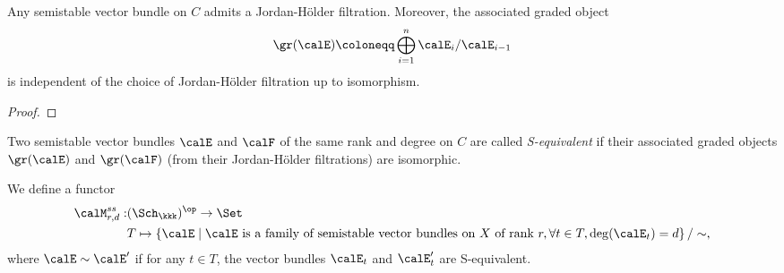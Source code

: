     \begin{proposition}\label{prop:existence_and_uniqueness_of_Jordan-Holder_filtration}
        Any semistable vector bundle on \(C\) admits a Jordan-H\"older filtration.
        Moreover, the associated graded object 
        \[ \gr(\calE) \coloneqq \bigoplus_{i=1}^n \calE_i/\calE_{i-1} \]
        is independent of the choice of Jordan-H\"older filtration up to isomorphism.
    \end{proposition}
    \begin{proof}
    \end{proof}

    \begin{definition}[S-equivalence]\label{def:S-equivalence}
        Two semistable vector bundles \(\calE\) and \(\calF\) of the same rank and degree on \(C\) are called \emph{S-equivalent} 
        if their associated graded objects \(\gr(\calE)\) and \(\gr(\calF)\) (from their Jordan-H\"older filtrations) are isomorphic.
    \end{definition}


    \begin{definition}\label{def:coarse_moduli_functor_of_vector_bundles}
        We define a functor 
        \begin{align*}
            \calM_{r,d}^{ss} : & (\Sch_\kkk)^{\op} \to \Set \\
            & T \mapsto \left\{ 
                \calE 
            \;\middle|\;
                \calE \text{ is a family of semistable vector bundles on } X \text{ of rank } r, \forall t \in T, \deg(\calE_t) = d
            \right\}/ \sim,
        \end{align*}
        where \(\calE \sim \calE'\) if for any \(t \in T\), the vector bundles \(\calE_t\) and \(\calE'_t\) are S-equivalent.
    \end{definition}